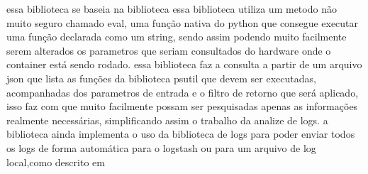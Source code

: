 \documentclass[
	12pt,				%
	openright,			%
	oneside,			%
	a4paper,			%
	english,			%
	french,				%
	spanish,			%
	brazil,				%
	]{abntex2}
\begin{document}
essa biblioteca se baseia na biblioteca  essa biblioteca utiliza um metodo não muito seguro chamado eval,
uma função nativa do python que consegue executar uma função declarada como um string,
sendo assim podendo muito facilmente serem alterados os parametros que seriam consultados do hardware onde o container está sendo rodado.
essa biblioteca faz a consulta a partir de um arquivo json que lista as funções da biblioteca psutil que devem ser executadas,
acompanhadas dos parametros de entrada e o filtro de retorno que será aplicado,
isso faz com que muito facilmente possam ser pesquisadas apenas as informações realmente necessárias,
simplificando assim o trabalho da analize de logs.
a biblioteca ainda implementa o uso da biblioteca de logs para poder enviar todos os logs de forma automática para o logstash ou para um arquivo de log local,como descrito em 
\end{document}
